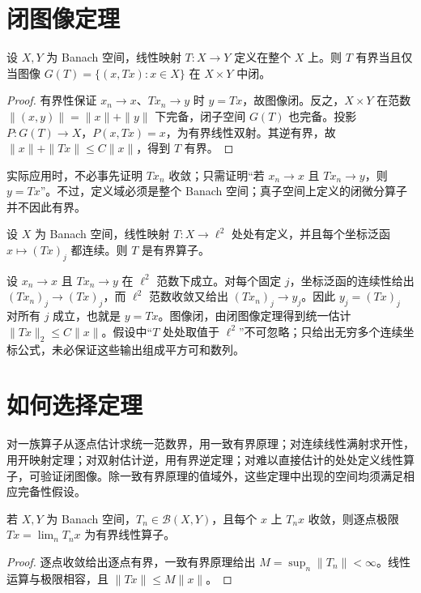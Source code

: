 \documentclass[UTF8,12pt,a4paper,fontset=fandol]{ctexbook}
\begin{document}
\section{闭图像定理}
\begin{theorem}\label{thm:fa-closed-graph}
设 $X,Y$ 为 Banach 空间，线性映射 $T:X\to Y$ 定义在整个 $X$ 上。则 $T$ 有界当且仅当图像 $G(T)=\{(x,Tx):x\in X\}$ 在 $X\times Y$ 中闭。
\end{theorem}
\begin{proof}
有界性保证 $x_n\to x$、$Tx_n\to y$ 时 $y=Tx$，故图像闭。反之，$X\times Y$ 在范数 $\|(x,y)\|=\|x\|+\|y\|$ 下完备，闭子空间 $G(T)$ 也完备。投影 $P:G(T)\to X$，$P(x,Tx)=x$，为有界线性双射。其逆有界，故 $\|x\|+\|Tx\|\leq C\|x\|$，得到 $T$ 有界。
\end{proof}
实际应用时，不必事先证明 $Tx_n$ 收敛；只需证明“若 $x_n\to x$ 且 $Tx_n\to y$，则 $y=Tx$”。不过，定义域必须是整个 Banach 空间；真子空间上定义的闭微分算子并不因此有界。

\begin{example}[利用闭图像验证连续性]
设 $X$ 为 Banach 空间，线性映射 $T:X\to\ell^2$ 处处有定义，并且每个坐标泛函 $x\mapsto(Tx)_j$ 都连续。则 $T$ 是有界算子。
\end{example}
\begin{solve}
设 $x_n\to x$ 且 $Tx_n\to y$ 在 $\ell^2$ 范数下成立。对每个固定 $j$，坐标泛函的连续性给出 $(Tx_n)_j\to(Tx)_j$，而 $\ell^2$ 范数收敛又给出 $(Tx_n)_j\to y_j$。因此 $y_j=(Tx)_j$ 对所有 $j$ 成立，也就是 $y=Tx$。图像闭，由闭图像定理得到统一估计 $\|Tx\|_2\leq C\|x\|$。假设中“$T$ 处处取值于 $\ell^2$”不可忽略；只给出无穷多个连续坐标公式，未必保证这些输出组成平方可和数列。
\end{solve}

\section{如何选择定理}
对一族算子从逐点估计求统一范数界，用一致有界原理；对连续线性满射求开性，用开映射定理；对双射估计逆，用有界逆定理；对难以直接估计的处处定义线性算子，可验证闭图像。除一致有界原理的值域外，这些定理中出现的空间均须满足相应完备性假设。

\begin{proposition}
若 $X,Y$ 为 Banach 空间，$T_n\in\mathcal B(X,Y)$，且每个 $x$ 上 $T_nx$ 收敛，则逐点极限 $Tx=\lim_nT_nx$ 为有界线性算子。
\end{proposition}
\begin{proof}
逐点收敛给出逐点有界，一致有界原理给出 $M=\sup_n\|T_n\|<\infty$。线性运算与极限相容，且 $\|Tx\|\leq M\|x\|$。
\end{proof}
\end{document}
